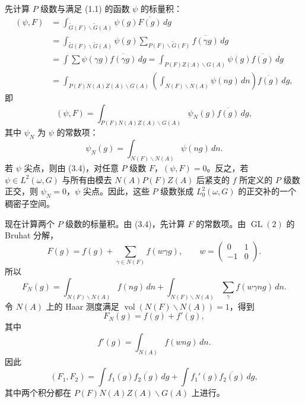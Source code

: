 先计算 $P$ 级数与满足 (1.1) 的函数 $\psi$ 的标量积：
\[
\begin{aligned}
 (\psi,F)
 &=\int_{\widetilde G(F)\backslash\widetilde G(A)}\psi(g)\overline{F(g)}\,dg\\
 &=\int_{\widetilde G(F)\backslash\widetilde G(A)}\psi(g)
 \sum_{P(F)\backslash\widetilde G(F)}\overline{f(\gamma g)}\,dg\\
 &=\int\sum\psi(\gamma g)\overline{f(\gamma g)}\,dg
 =\int_{P(F)Z(A)\backslash G(A)}\psi(g)\overline{f(g)}\,dg\\
 &=\int_{P(F)N(A)Z(A)\backslash G(A)}
 \left(\int_{N(F)\backslash N(A)}\psi(ng)\,dn\right)\overline{f(g)}\,dg,
\end{aligned}
\]
即
\begin{equation}
 (\psi,F)=\int_{P(F)N(A)Z(A)\backslash G(A)}\psi_N(g)\overline{f(g)}\,dg,\tag{3.4}
\end{equation}
其中 $\psi_N$ 为 $\psi$ 的常数项：
\begin{equation}
 \psi_N(g)=\int_{N(F)\backslash N(A)}\psi(ng)\,dn.\tag{3.5}
\end{equation}
若 $\psi$ 尖点，则由 (3.4)，对任意 $P$ 级数 $F$，$(\psi,F)=0$。反之，若
$\psi\in L^2(\omega,G)$ 与所有由模去 $N(A)P(F)Z(A)$ 后紧支的 $f$ 所定义的 $P$ 级数正交，则
$\psi_N=0$，$\psi$ 尖点。因此，这些 $P$ 级数张成 $L_0^2(\omega,G)$ 的正交补的一个稠密子空间。

现在计算两个 $P$ 级数的标量积。由 (3.4)，先计算 $F$ 的常数项。由
$\operatorname{GL}(2)$ 的 Bruhat 分解，
\[
 F(g)=f(g)+\sum_{\gamma\in N(F)}f(w\gamma g),\qquad
 w=\begin{pmatrix}0&1\\-1&0\end{pmatrix}.
\]
所以
\[
 F_N(g)=\int_{N(F)\backslash N(A)}f(ng)\,dn
 +\int_{N(F)\backslash N(A)}\sum_\gamma f(w\gamma ng)\,dn.
\]
令 $N(A)$ 上的 Haar 测度满足 $\operatorname{vol}(N(F)\backslash N(A))=1$，得到
\begin{equation}
 F_N(g)=f(g)+f'(g),\tag{3.6}
\end{equation}
其中
\begin{equation}
 f'(g)=\int_{N(A)}f(wng)\,dn.\tag{3.7}
\end{equation}
因此
\begin{equation}
 (F_1,F_2)=\int f_1(g)\overline{f_2(g)}\,dg
 +\int f_1'(g)\overline{f_2(g)}\,dg,\tag{3.8}
\end{equation}
其中两个积分都在 $P(F)N(A)Z(A)\backslash G(A)$ 上进行。

